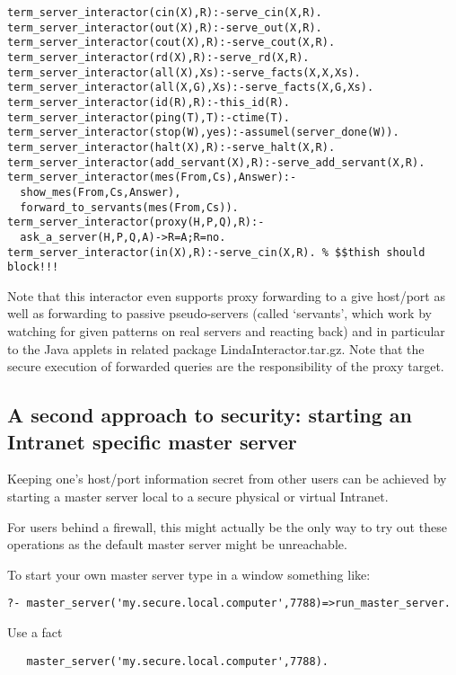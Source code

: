 \documentclass{article}
\begin{document}
\begin{verbatim}
term_server_interactor(cin(X),R):-serve_cin(X,R).
term_server_interactor(out(X),R):-serve_out(X,R).
term_server_interactor(cout(X),R):-serve_cout(X,R).
term_server_interactor(rd(X),R):-serve_rd(X,R).
term_server_interactor(all(X),Xs):-serve_facts(X,X,Xs).
term_server_interactor(all(X,G),Xs):-serve_facts(X,G,Xs).
term_server_interactor(id(R),R):-this_id(R).
term_server_interactor(ping(T),T):-ctime(T).
term_server_interactor(stop(W),yes):-assumel(server_done(W)).
term_server_interactor(halt(X),R):-serve_halt(X,R).
term_server_interactor(add_servant(X),R):-serve_add_servant(X,R).
term_server_interactor(mes(From,Cs),Answer):-
  show_mes(From,Cs,Answer),
  forward_to_servants(mes(From,Cs)).
term_server_interactor(proxy(H,P,Q),R):-
  ask_a_server(H,P,Q,A)->R=A;R=no.
term_server_interactor(in(X),R):-serve_cin(X,R). % $$thish should block!!!
\end{verbatim}

Note that this interactor even supports proxy forwarding
to a give host/port as well as forwarding
to passive pseudo-servers (called `servants', which
work by watching for given patterns on real servers
and reacting back)
and in particular to the Java applets in related package
LindaInteractor.tar.gz.
Note that the secure execution
of forwarded queries are the responsibility of the 
proxy target.

\subsection{A second approach to security: starting an
Intranet specific master server}

Keeping one's host/port information secret from other users
can be achieved by starting a master server local to a secure
physical or virtual Intranet.

For users behind a firewall, this might actually be the only
way to try out these operations as the default master server
might be unreachable.

To start your own master server type in a window something like:

\begin{verbatim}
?- master_server('my.secure.local.computer',7788)=>run_master_server.
\end{verbatim}

Use a fact
\begin{verbatim}
   master_server('my.secure.local.computer',7788).
\end{verbatim}
\end{document}
